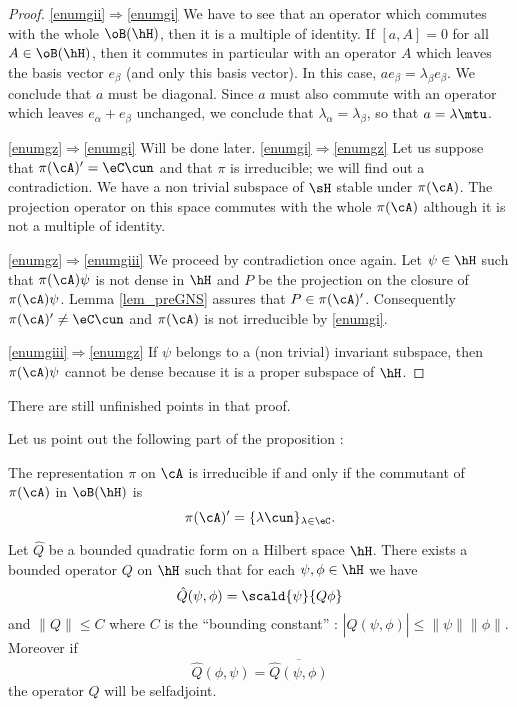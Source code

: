 \begin{proof}
\ref{enumgii}$\Rightarrow$\ref{enumgi}
We have to see that an operator which commutes with the whole $\oB(\hH)$, then it is a multiple of identity. If $[a,A]=0$ for all $A\in\oB(\hH)$, then it commutes in particular with an operator $A$ which leaves the basis vector $e_{\beta}$ (and only this basis vector). In this case, $ae_{\beta}=\lambda_{\beta}e_{\beta}$. We conclude that $a$ must be diagonal. Since $a$ must also commute with an operator which leaves $e_{\alpha}+e_{\beta}$ unchanged, we conclude that $\lambda_{\alpha}=\lambda_{\beta}$, so that $a=\lambda\mtu$.

\ref{enumgz}$\Rightarrow$\ref{enumgi} Will be done later.
\ref{enumgi}$\Rightarrow$\ref{enumgz} Let us suppose that $\pi(\cA)'=\eC\cun$ and that $\pi$ is irreducible; we will find out a contradiction. We have a non trivial subspace of $\sH$ stable under $\pi(\cA)$. The projection operator on this space commutes with the whole $\pi(\cA)$ although it is not a multiple of identity.

\ref{enumgz}$\Rightarrow$\ref{enumgiii} We proceed by contradiction once again.  Let $\psi\in\hH$ such that $\pi(\cA)\psi$ is not dense in $\hH$ and $P$ be the projection on the closure of $\pi(\cA)\psi$. Lemma \ref{lem_preGNS} assures that $P\in\pi(\cA)'$. Consequently $\pi(\cA)'\neq \eC\cun$ and $\pi(\cA)$ is not irreducible by \ref{enumgi}.

\ref{enumgiii}$\Rightarrow$\ref{enumgz} If $\psi$ belongs to a (non trivial) invariant subspace, then $\pi(\cA)\psi$ cannot be dense because it is a proper subspace of $\hH$.

\end{proof}

\begin{probleme}
    There are still unfinished points in that proof.
\end{probleme}


Let us point out the following part of the proposition :

\begin{lemma}
The representation $\pi$ on $\cA$ is irreducible if and only if the commutant of $\pi(\cA)$ in $\oB(\hH)$ is
 \[ 
  \pi(\cA)'=\{ \lambda\cun \}_{\lambda\in\eC}.
\]

\end{lemma}


\begin{lemma} 
Let $\hat Q$ be a bounded quadratic form on a Hilbert space $\hH$. There exists a bounded operator $Q$ on $\hH$ such that for each $\psi,\phi\in\hH$ we have 
\[
\hat Q(\psi,\phi)=\scald{ \psi}{Q\phi }
\]
 and $\| Q \|\leq C$ where $C$ is the ``bounding constant'' : $| \hat Q(\psi,\phi) |\leq \| \psi \|\| \phi \|$.
Moreover if 
%
\begin{equation}  \label{eq_r19032}
\hat Q(\phi,\psi)=\overline{ \hat Q(\psi,\phi) }
\end{equation}
 the operator $Q$ will be selfadjoint.
\label{lem_r19031}
\end{lemma}

